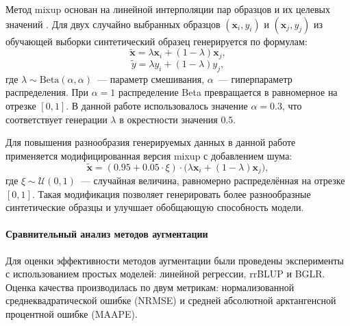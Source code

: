 Метод mixup основан на линейной интерполяции пар образцов и их целевых 
значений \cite{MontesinosLopez2024, Meuwissen2016}. 
Для двух случайно выбранных образцов $(\mathbf{x}_i, y_i)$ и 
$(\mathbf{x}_j, y_j)$ из обучающей выборки синтетический образец 
генерируется по формулам:
\[
\tilde{\mathbf{x}} = \lambda \mathbf{x}_i + (1 - \lambda) \mathbf{x}_j,
\]
\[
\tilde{y} = \lambda y_i + (1 - \lambda) y_j,
\]
где $\lambda \sim \text{Beta}(\alpha, \alpha)$~--- параметр смешивания, 
$\alpha$~--- гиперпараметр распределения. При $\alpha = 1$ распределение 
Beta превращается в равномерное на отрезке $[0,1]$. В данной работе 
использовалось значение $\alpha = 0.3$, что соответствует генерации 
$\lambda$ в окрестности значения $0.5$.

Для повышения разнообразия генерируемых данных в данной работе 
применяется модифицированная версия mixup с добавлением шума:
\[
\tilde{\mathbf{x}} = (0.95 + 0.05 \cdot \xi) \cdot \bigl(\lambda \mathbf{x}_i + (1 - \lambda) \mathbf{x}_j\bigr),
\]
где $\xi \sim \mathcal{U}(0,1)$~--- случайная величина, равномерно 
распределённая на отрезке $[0,1]$. Такая модификация позволяет 
генерировать более разнообразные синтетические образцы и улучшает 
обобщающую способность модели.


	
	
	
	
	

\paragraph{Сравнительный анализ методов аугментации}

Для оценки эффективности методов аугментации были проведены 
эксперименты с использованием простых моделей: линейной регрессии, 
rrBLUP и BGLR. Оценка качества производилась по двум метрикам:
нормализованной среднеквадратической ошибке (NRMSE) и средней 
абсолютной арктангенсной процентной ошибке (MAAPE).

